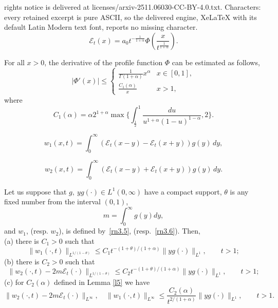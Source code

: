 \documentclass[10pt,a4paper]{amsart}
\def\sE{{\mathscr{E}}}
\begin{document}
rights notice is delivered at licenses/arxiv-2511.06030-CC-BY-4.0.txt. Characters: every retained excerpt is pure ASCII, so the delivered engine, XeLaTeX with its default Latin Modern text font, reports no missing character.
\begin{equation}\label{df-e}
\sE_t(x)=%
a_0t^{-\frac{1}{1+\alpha}}\Phi\left(\frac{x}{t^{\frac{1}{1+\alpha}}}\right).
\end{equation}

\begin{lemma}\label{l4}
For all $x>0$, the derivative of the profile function $\Phi$ can be %
estimated as follows,
\begin{equation}\label{poch}
|\Phi'(x)|\leq 
\left\{
\begin{array}{cc}
 \frac1{\Gamma(1+\alpha)} x^\alpha    &  x\in [0, 1], \\
 \frac{C_1(\alpha)}{x}&  x>1,
\end{array}
\right.
\end{equation}
where 
$$
C_1(\alpha) = \alpha 2^{1+\alpha}\max\bigg\{\int_{\frac12}^1 \frac{du}{ u^{1+\alpha}(1-u)^{1-\alpha}}, 2\bigg\}.
$$
\end{lemma}

\begin{equation}\label{rn3.5}
w_1(x,t) = \int_0^\infty ( \sE_t(x-y) - \sE_t(x+y))g(y)\,dy,
\end{equation}

\begin{equation}\label{rn3.6}
w_2(x,t)  = \int_0^\infty ( \sE_t(x-y) + \sE_t(x+y))g(y)\,dy.
\end{equation}

\begin{theorem}\label{t1}
Let us suppose that  $g,\ yg(\cdot) \in L^1(0,\infty)$ have a compact support, $\theta$ is any fixed number from the interval $(0,1)$, 
\begin{equation}\label{df-m}
m=\int_0^\infty g(y)dy,
\end{equation} 
and $w_1$, (resp. $w_2$), is defined by~\eqref{rn3.5}, (resp.~\eqref{rn3.6}).
Then, \\
(a) there is $C_1>0$ such that 
$$
\|w_1(\cdot,t) \|_{L^{1/(1-\theta)}} \le C_1  t^{- (1+\theta)/(1+\alpha)} \|y g(\cdot)\|_{L^1}, \qquad t>1;
$$
(b) there is $C_2>0$ such that 
$$
\|w_2(\cdot,t)-2m\sE_t(\cdot)\|_{L^{1/(1-\theta)}} \le C_2 
 t^{- (1+\theta)/(1+\alpha)} \|y g(\cdot)\|_{L^1},\qquad t>1;
$$
(c) for $C_2(\alpha)$ defined in Lemma \ref{l5} we have
$$
\|w_2(\cdot,t)-2m\sE_t(\cdot)\|_{L^\infty}, \quad 
\|w_1(\cdot,t) \|_{L^\infty} \le \frac{C_2(\alpha)}{t^{2/(1+\alpha)}} \|y g(\cdot)\|_{L^1}, \qquad t>1.
$$
\end{theorem}
\end{document}
